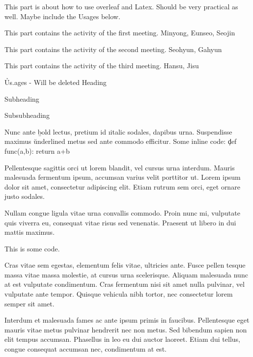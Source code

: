 \documentclass{textbook}
\begin{document}
This part is about how to use overleaf and Latex. Should be very practical as well. Maybe include the Usages below.


This part contains the activity of the first meeting.
Minyong, Eunseo, Seojin

This part contains the activity of the second meeting.
Seohyun, Gahyun

This part contains the activity of the third meeting.
Hansu, Jisu


\h{Us.ages - Will be deleted}
Heading

Subheading

Subsubheading

Nunc ante \b{bold} lectus, pretium id \i{italic} sodales, dapibus  urna. Suspendisse maximus \u{underlined} metus sed ante commodo efficitur. Some inline code: \c{def func(a,b): return a+b}

Pellentesque sagittis orci ut lorem blandit, vel cursus urna interdum. Mauris malesuada fermentum ipsum, accumsan varius velit porttitor ut. Lorem ipsum dolor sit amet, consectetur adipiscing elit. Etiam rutrum sem orci, eget ornare justo sodales.


Nullam congue ligula vitae urna convallis commodo. Proin nunc mi, vulputate quis viverra eu, consequat vitae risus sed venenatis. Praesent ut libero in dui mattis maximus.

    {This is some code.}

Cras vitae sem egestas, elementum felis vitae, ultricies ante. Fusce pellen tesque massa vitae massa molestie, at cursus urna scelerisque. Aliquam malesuada nunc at est vulputate condimentum. Cras fermentum nisi sit amet nulla pulvinar, vel vulputate ante tempor. Quisque vehicula nibh tortor, nec consectetur lorem semper sit amet.

Interdum et malesuada fames ac ante ipsum primis in faucibus. Pellentesque eget mauris vitae metus pulvinar hendrerit nec non metus. Sed bibendum sapien non elit tempus accumsan. Phasellus in leo eu dui auctor laoreet. Etiam dui tellus, congue consequat accumsan nec, condimentum at est.
\end{document}
